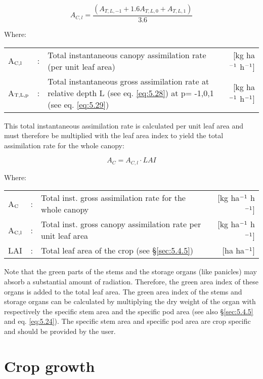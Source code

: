\begin{equation}
A_{C,l} = {\frac{(A_{T,L,-1} + 1.6 A_{T,L,0} + A_{T,L,1})}{3.6}}
\end{equation}

Where:\\[5pt]
\begin{tabularx}{\textwidth}{llXr}
A$_{{\rm C,l}}$ &:& Total instantaneous canopy assimilation 
   rate (per unit leaf area)    &    [kg ha$^{{\rm -1}}$ h$^{{\rm -1}}$]\\
A$_{{\rm T,L,p}}$ &:& Total instantaneous gross assimilation rate at relative 
   depth L (see eq. \ref{eq:5.28}) at p= -1,0,1 (see eq. \ref{eq:5.29})    &    
   [kg ha$^{{\rm -1}}$ h$^{{\rm -1}}$]\\
\end{tabularx}

This total instantaneous assimilation rate is calculated per unit leaf area and must
therefore be multiplied with the leaf area index to yield the total assimilation rate for the
whole canopy:

\begin{equation}
\label{eq:5.31}
A_{C} = A_{C,l} \cdot LAI
\end{equation}

Where:\\[5pt]
\begin{tabularx}{\textwidth}{llXr}
A$_{{\rm C}}$ &:& Total inst. gross assimilation rate for
   the whole canopy  &  [kg ha$^{{\rm -1}}$ h$^{{\rm -1}}$]\\
A$_{{\rm C,l}}$ &:& Total inst. gross canopy assimilation rate 
   per unit leaf area &  [kg ha$^{{\rm -1}}$ h$^{{\rm -1}}$]\\
LAI &:& Total leaf area of the crop (see \S \ref{sec:5.4.5})  & [ha ha$^{{\rm -1}}$]\\
\end{tabularx}

Note that the green parts of the stems and the storage organs (like panicles) may absorb a
substantial amount of radiation. Therefore, the green area index of these organs is added
to the total leaf area. The green area index of the stems and storage organs can be
calculated by multiplying the dry weight of the organ with respectively the specific stem
area and the specific pod area (see also \S \ref{sec:5.4.5} and eq. \ref{eq:5.24}). The specific 
stem area and specific pod area are crop specific and should be provided by the user.


\section{Crop growth}


